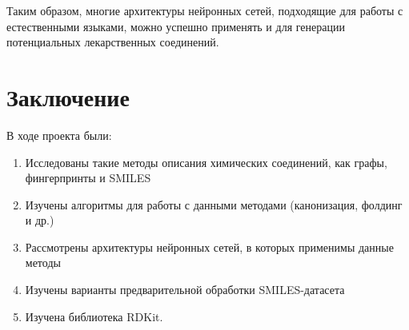 \documentclass[a4paper,14pt]{extreport}
\begin{document}
  Таким образом, многие архитектуры нейронных сетей, подходящие для работы с естественными языками, можно успешно применять и для генерации потенциальных лекарственных соединений.
  

  \chapter*{Заключение}
  \label{c:conclusion}
 В ходе проекта были:
  \begin{enumerate}
  \item Исследованы такие методы описания химических соединений, как графы, фингерпринты и SMILES
  \item Изучены алгоритмы для работы с данными методами (канонизация, фолдинг и др.)
  \item Рассмотрены архитектуры нейронных сетей, в которых применимы данные методы
  \item Изучены варианты предварительной обработки SMILES-датасета
  \item Изучена библиотека RDKit.
  \end{enumerate}
  
\end{document}
